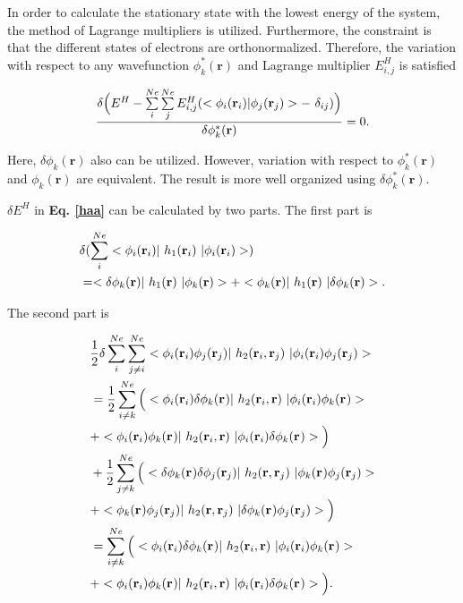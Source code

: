 \documentclass[a4paper, 12pt, titlepage,oneside,drop]{kthesis}
\begin{document}
In order to calculate the stationary state with the lowest energy of the system, the method of Lagrange multipliers is utilized. Furthermore, the constraint is that the different states of electrons are orthonormalized.
Therefore, the variation with respect to any wavefunction $\phi^*_{k}(\textbf{r})$ and Lagrange multiplier $E_{i,j}^{H}$ is satisfied

\begin{equation}\begin{split}\label{haa}
 \frac{ \delta  \Big(E^{{H}} - \sum\limits_{i}^{Ne} \sum\limits_{j}^{Ne} E_{i,j}^{H} (<\bwff<i><i> | \bwff<j><j>> -\ \delta_{ij})\Big)}{\delta \phi^*_{k}(\textbf{r})}  = 0. 
\end{split}
\end{equation}


Here, $ \delta \phi_{k}(\textbf{r})$ also can be utilized. However, variation with respect to $\phi^*_{k}(\textbf{r})$ and $\phi_{k}(\textbf{r})$ are equivalent. The result is more well organized using $\delta \phi^*_{k}(\textbf{r})$.

$\delta E^{{H}}$ in \textbf{Eq. \ref{haa}} can be calculated by two parts. The first part is 

\begin{equation}\begin{split}\label{hartree1}
&  \delta ( \sum\limits_i^{{Ne}} <\bwff<i><i> |\ h_1(\textbf{r}_{i})  \ | \bwff<i><i> > )  \\
& =  < \delta \phi_{{k}}(\textbf{r}) |\ h_1(\textbf{r})  \ |  \phi_{{k}}(\textbf{r}) >  +  < \phi_{{k}}(\textbf{r}) |\ h_1(\textbf{r})  \ | \delta \phi_{{k}}(\textbf{r}) >. 
\end{split}\end{equation}

The second part is

\begin{equation}\begin{split}\label{hartree2}
& \frac{1}{2} \delta \sum\limits_i^{{Ne}} \sum\limits_{j \neq i}^{{Ne}} <\bwff<i><i> \bwff<j><j>|\ h_2(\textbf{r}_{i},\textbf{r}_{j}) \ | \bwff<i><i> \bwff<j><j>> \\
& = \frac{1}{2}  \sum\limits_{i \neq k}^{{Ne}} \Big( <\bwff<i><i>  \delta \bwff<k><>|\ h_2(\textbf{r}_{i},\textbf{r}) \ | \bwff<i><i> \bwff<k><>> \\
& + <\bwff<i><i>  \bwff<k><>|\ h_2(\textbf{r}_{i},\textbf{r}) \ | \bwff<i><i> \delta \bwff<k><>> \Big) \\
& + \frac{1}{2}  \sum\limits_{j \neq k}^{{Ne}} \Big( <\delta \bwff<k><>  \delta \bwff<j><j>|\ h_2(\textbf{r},\textbf{r}_{j}) \ | \bwff<k><> \bwff<j><j>> \\
& + < \bwff<k><>  \bwff<j><j>|\ h_2(\textbf{r},\textbf{r}_{j}) \ | \delta \bwff<k><> \bwff<j><j>> \Big) \\
& =   \sum\limits_{i \neq k}^{{Ne}} \Big( <\bwff<i><i>  \delta \bwff<k><>|\ h_2(\textbf{r}_{i},\textbf{r}) \ | \bwff<i><i> \bwff<k><>> \\
& + <\bwff<i><i>  \bwff<k><>|\ h_2(\textbf{r}_{i},\textbf{r}) \ | \bwff<i><i> \delta \bwff<k><>> \Big). 
\end{split}\end{equation}
\end{document}
